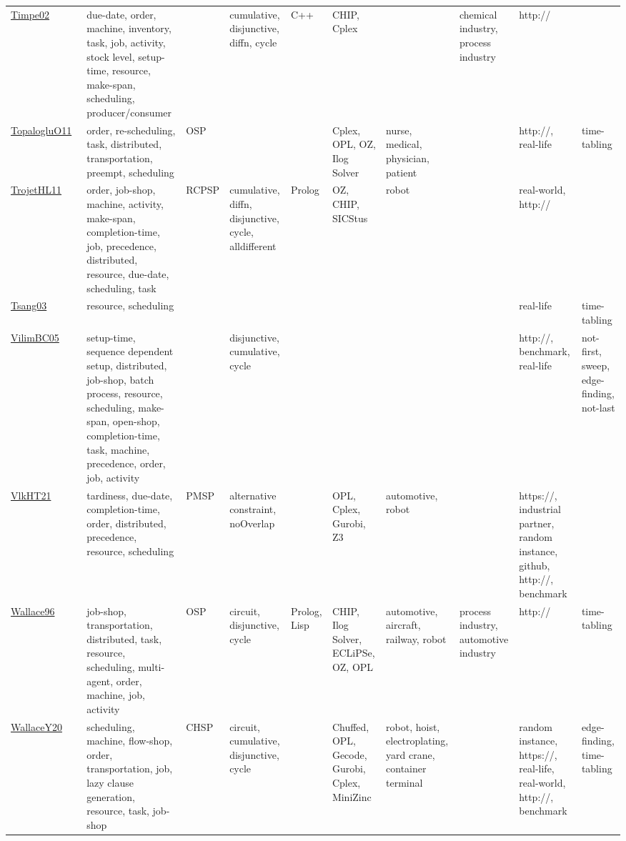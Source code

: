 {\begin{longtable}{p{3cm}p{4cm}p{2cm}p{2cm}p{2cm}p{2cm}p{2cm}p{2cm}p{2cm}p{2cm}}
\href{articles/Timpe02.pdf}{Timpe02}~\cite{Timpe02} & due-date, order, machine, inventory, task, job, activity, stock level, setup-time, resource, make-span, scheduling, producer/consumer &  & cumulative, disjunctive, diffn, cycle & C++ & CHIP, Cplex &  & chemical industry, process industry & http:// & \\
\href{articles/TopalogluO11.pdf}{TopalogluO11}~\cite{TopalogluO11} & order, re-scheduling, task, distributed, transportation, preempt, scheduling & OSP &  &  & Cplex, OPL, OZ, Ilog Solver & nurse, medical, physician, patient &  & http://, real-life & time-tabling\\
\href{articles/TrojetHL11.pdf}{TrojetHL11}~\cite{TrojetHL11} & order, job-shop, machine, activity, make-span, completion-time, job, precedence, distributed, resource, due-date, scheduling, task & RCPSP & cumulative, diffn, disjunctive, cycle, alldifferent & Prolog & OZ, CHIP, SICStus & robot &  & real-world, http:// & \\
\href{articles/Tsang03.pdf}{Tsang03}~\cite{Tsang03} & resource, scheduling &  &  &  &  &  &  & real-life & time-tabling\\
\href{articles/VilimBC05.pdf}{VilimBC05}~\cite{VilimBC05} & setup-time, sequence dependent setup, distributed, job-shop, batch process, resource, scheduling, make-span, open-shop, completion-time, task, machine, precedence, order, job, activity &  & disjunctive, cumulative, cycle &  &  &  &  & http://, benchmark, real-life & not-first, sweep, edge-finding, not-last\\
\href{articles/VlkHT21.pdf}{VlkHT21}~\cite{VlkHT21} & tardiness, due-date, completion-time, order, distributed, precedence, resource, scheduling & PMSP & alternative constraint, noOverlap &  & OPL, Cplex, Gurobi, Z3 & automotive, robot &  & https://, industrial partner, random instance, github, http://, benchmark & \\
\href{articles/Wallace96.pdf}{Wallace96}~\cite{Wallace96} & job-shop, transportation, distributed, task, resource, scheduling, multi-agent, order, machine, job, activity & OSP & circuit, disjunctive, cycle & Prolog, Lisp & CHIP, Ilog Solver, ECLiPSe, OZ, OPL & automotive, aircraft, railway, robot & process industry, automotive industry & http:// & time-tabling\\
\href{articles/WallaceY20.pdf}{WallaceY20}~\cite{WallaceY20} & scheduling, machine, flow-shop, order, transportation, job, lazy clause generation, resource, task, job-shop & CHSP & circuit, cumulative, disjunctive, cycle &  & Chuffed, OPL, Gecode, Gurobi, Cplex, MiniZinc & robot, hoist, electroplating, yard crane, container terminal &  & random instance, https://, real-life, real-world, http://, benchmark & edge-finding, time-tabling\\

\end{longtable}}
